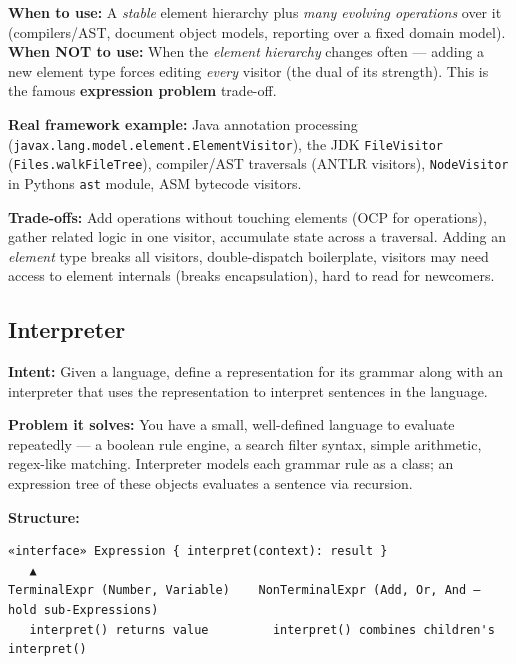 \documentclass[11pt]{article}
\begin{document}
\textbf{When to use:} A \emph{stable} element hierarchy plus \emph{many evolving operations} over it (compilers/AST, document object models, reporting over a fixed domain model). \textbf{When NOT to use:} When the \emph{element hierarchy} changes often --- adding a new element type forces editing \emph{every} visitor (the dual of its strength). This is the famous \textbf{expression problem} trade-off.

\textbf{Real framework example:} Java annotation processing (\texttt{javax.lang.model.element.ElementVisitor}), the JDK \texttt{FileVisitor} (\texttt{Files.walkFileTree}), compiler/AST traversals (ANTLR visitors), \texttt{NodeVisitor} in Python\textquotesingle s \texttt{ast} module, ASM bytecode visitors.

\textbf{Trade-offs:} Add operations without touching elements (OCP for operations), gather related logic in one visitor, accumulate state across a traversal. Adding an \emph{element} type breaks all visitors, double-dispatch boilerplate, visitors may need access to element internals (breaks encapsulation), hard to read for newcomers.

\subsection{Interpreter}\label{interpreter}

\textbf{Intent:} Given a language, define a representation for its grammar along with an interpreter that uses the representation to interpret sentences in the language.

\textbf{Problem it solves:} You have a small, well-defined language to evaluate repeatedly --- a boolean rule engine, a search filter syntax, simple arithmetic, regex-like matching. Interpreter models each grammar rule as a class; an expression tree of these objects evaluates a sentence via recursion.

\textbf{Structure:}

\setcodelang{}

\begin{verbatim}
«interface» Expression { interpret(context): result }
   ▲
TerminalExpr (Number, Variable)    NonTerminalExpr (Add, Or, And — hold sub-Expressions)
   interpret() returns value         interpret() combines children's interpret()
\end{verbatim}

\end{document}
